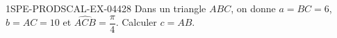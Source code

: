 \begin{exercice}{1SPE-PRODSCAL-EX-044}{2}{8}
Dans un triangle $ABC$, on donne $a = BC = 6$, $b = AC = 10$ et $\widehat{ACB} = \dfrac{\pi}{4}$. Calculer $c = AB$.
\end{exercice}
